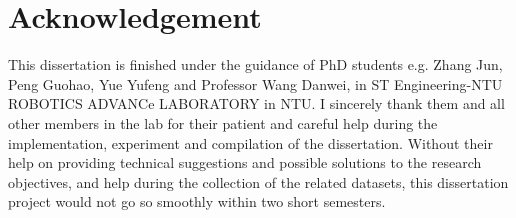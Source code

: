 
\chapter*{Acknowledgement}

This dissertation is finished under the guidance of PhD students e.g. Zhang Jun, Peng Guohao, Yue Yufeng and Professor Wang Danwei, in ST Engineering-NTU ROBOTICS ADVANCe LABORATORY in NTU. I sincerely thank them and all other members in the lab for their patient and careful help during the implementation, experiment and compilation of the dissertation. Without their help on providing technical suggestions and possible solutions to the research objectives, and help during the collection of the related datasets, this dissertation project would not go so smoothly within two short semesters.


